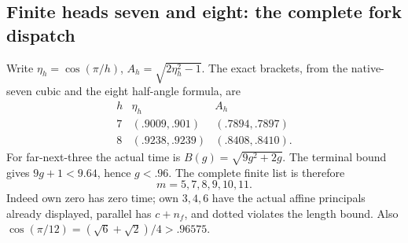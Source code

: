 \documentclass[11pt]{article}
\theoremstyle{definition}
\theoremstyle{remark}
\begin{document}
\subsection{Finite heads seven and eight: the complete fork dispatch}
\label{app:D18finite78forks}

Write \(\eta_h=\cos(\pi/h)\),
\(A_h=\sqrt{2\eta_h^2-1}\).
The exact brackets, from the native-seven cubic and the
eight half-angle formula, are
\[
 \begin{array}{c|cc}
 h&\eta_h&A_h\\ \hline
 7&(.9009,.901)&(.7894,.7897)\\
 8&(.9238,.9239)&(.8408,.8410).
 \end{array}
\tag{DFheadbrackets}\label{eq:DFheadbrackets}
\]
For far-next-three the actual time is \(B(g)=\sqrt{9g^2+2g}\).
The terminal bound gives \(9g+1<9.64\), hence \(g<.96\).
The complete finite list is therefore
\[
                         m=5,7,8,9,10,11 .
\]
Indeed own zero has zero time; own \(3,4,6\) have the actual
affine principals already displayed, parallel has \(c+n_f\),
and dotted violates the length bound.
Also \(\cos(\pi/12)=(\sqrt6+\sqrt2)/4>.96575\).
\end{document}
